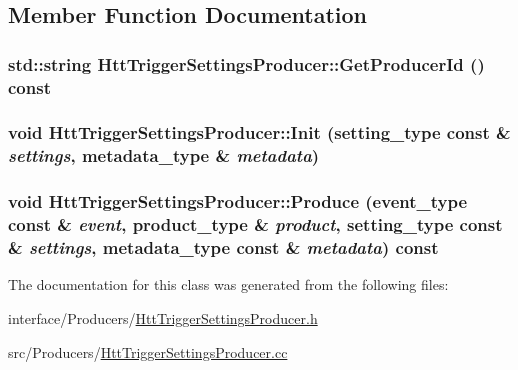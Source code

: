 \subsection{Member Function Documentation}
\hypertarget{classHttTriggerSettingsProducer_a31b44c47c6a23463ffc9b6b649beb7ae}{
\subsubsection[{GetProducerId}]{\setlength{\rightskip}{0pt plus 5cm}std::string HttTriggerSettingsProducer::GetProducerId () const}}
\label{classHttTriggerSettingsProducer_a31b44c47c6a23463ffc9b6b649beb7ae}
\hypertarget{classHttTriggerSettingsProducer_a30cc02de6aa44308f888170653930fc8}{
\subsubsection[{Init}]{\setlength{\rightskip}{0pt plus 5cm}void HttTriggerSettingsProducer::Init (setting\_\-type const \& {\em settings}, \/  metadata\_\-type \& {\em metadata})}}
\label{classHttTriggerSettingsProducer_a30cc02de6aa44308f888170653930fc8}
\hypertarget{classHttTriggerSettingsProducer_ad24b2f54c1c3740e2fa3c12bab665b6e}{
\subsubsection[{Produce}]{\setlength{\rightskip}{0pt plus 5cm}void HttTriggerSettingsProducer::Produce (event\_\-type const \& {\em event}, \/  product\_\-type \& {\em product}, \/  setting\_\-type const \& {\em settings}, \/  metadata\_\-type const \& {\em metadata}) const}}
\label{classHttTriggerSettingsProducer_ad24b2f54c1c3740e2fa3c12bab665b6e}


The documentation for this class was generated from the following files:\begin{DoxyCompactItemize}
\item 
interface/Producers/\hyperlink{HttTriggerSettingsProducer_8h}{HttTriggerSettingsProducer.h}\item 
src/Producers/\hyperlink{HttTriggerSettingsProducer_8cc}{HttTriggerSettingsProducer.cc}\end{DoxyCompactItemize}
